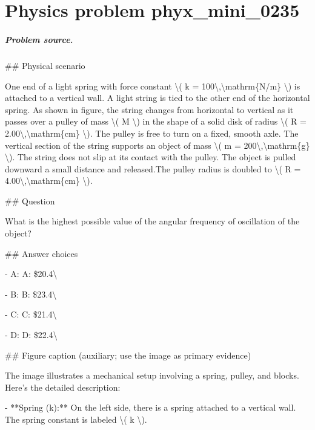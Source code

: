 
\chapter{Physics problem phyx\_mini\_0235}
\label{ch:PhyXMiniProblems_problem_phyx_mini_0235}

\paragraph{Problem source.}
\#\# Physical scenario

One end of a light spring with force constant \textbackslash{}( k = 100\textbackslash{},\textbackslash{}mathrm\{N/m\} \textbackslash{}) is attached to a vertical wall. A light string is tied to the other end of the horizontal spring. As shown in figure, the string changes from horizontal to vertical as it passes over a pulley of mass \textbackslash{}( M \textbackslash{}) in the shape of a solid disk of radius \textbackslash{}( R = 2.00\textbackslash{},\textbackslash{}mathrm\{cm\} \textbackslash{}). The pulley is free to turn on a fixed, smooth axle. The vertical section of the string supports an object of mass \textbackslash{}( m = 200\textbackslash{},\textbackslash{}mathrm\{g\} \textbackslash{}). The string does not slip at its contact with the pulley. The object is pulled downward a small distance and released.The pulley radius is doubled to \textbackslash{}( R = 4.00\textbackslash{},\textbackslash{}mathrm\{cm\} \textbackslash{}).

\#\# Question

What is the highest possible value of the angular frequency of oscillation of the object?

\#\# Answer choices

- A: A: \$20.4\textbackslash{}

- B: B: \$23.4\textbackslash{}

- C: C: \$21.4\textbackslash{}

- D: D: \$22.4\textbackslash{}

\#\# Figure caption (auxiliary; use the image as primary evidence)

The image illustrates a mechanical setup involving a spring, pulley, and blocks. Here's the detailed description:

- **Spring (k):** On the left side, there is a spring attached to a vertical wall. The spring constant is labeled \textbackslash{}( k \textbackslash{}).

